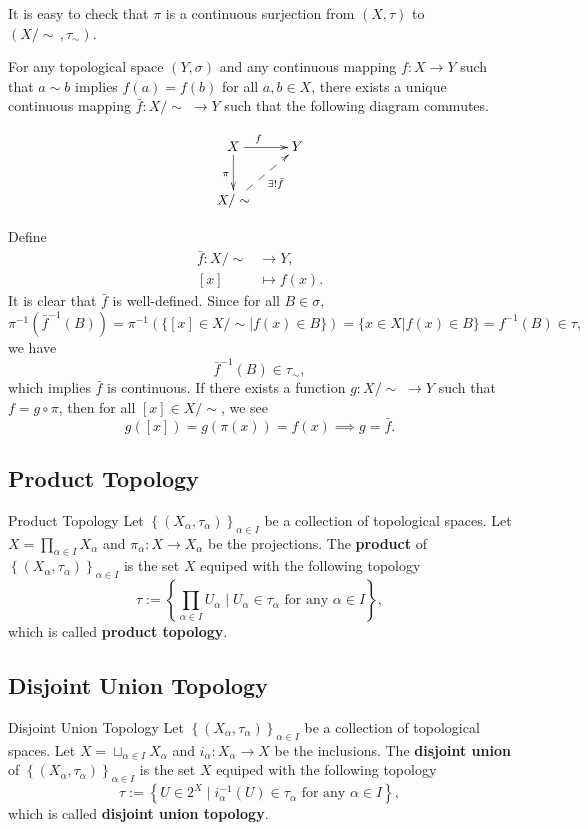 \documentclass{report}
\begin{document}
It is easy to check that $\pi$ is a continuous surjection from $(X,\tau)$ to $(X/\sim\,,\tau_\sim)$.

\begin{proposition}{}{}
	For any topological space $(Y,\sigma)$ and any continuous mapping $f:X\to Y$ such that $a\sim b$ implies $f(a) = f(b)$ for all $a,b \in X$, there exists a unique continuous mapping $\bar{f}:X/\sim\;\to Y$ such that the following diagram commutes.

	\[\xymatrix{
		X\ar[r]^{f\quad}\ar[d]_{\pi}  &Y\\
		X/\sim\ar@{-->}[ru]_{\exists!\bar{f}}&
		}\]
\end{proposition}



\begin{prf}
	Define
	\begin{align*}
		\bar{f}:X/\sim & \longrightarrow Y, \\
		[x]            & \longmapsto f(x).
	\end{align*}
	It is clear that $\bar{f}$ is well-defined. Since for all $B\in \sigma$,
	\[
		\pi^{-1}\left(\bar{f}^{-1}(B)\right)=\pi^{-1}\left(\{[x]\in X/\sim| f(x)\in B\}\right)=\{x\in X| f(x)\in B\}=f^{-1}(B)\in \tau,
	\]
	we have
	\[
		\bar{f}^{-1}(B)\in \tau_\sim,
	\]
	which implies $\bar{f}$ is continuous. If there exists a function $g:X/\sim\;\to Y$ such that $f=g\circ\pi$, then for all $[x]\in X/\sim$, we see
	\[
		g([x])=g(\pi(x))=f(x)\implies g=\bar{f}.
	\]
\end{prf}



\subsection{Product Topology}
\begin{definition}{Product Topology}{}
	Let $\left\{(X_\alpha,\tau_\alpha)\right\}_{\alpha\in I}$ be a collection of topological spaces. Let $X=\prod_{\alpha\in I}X_\alpha$ and $\pi_\alpha:X\to X_\alpha$ be the projections. The \textbf{product} of $\left\{(X_\alpha,\tau_\alpha)\right\}_{\alpha\in I}$ is the set $X$ equiped with the following topology
	\[
		\tau:=\left\{\prod_{\alpha\in I}U_\alpha\mid U_\alpha\in \tau_\alpha\text{ for any }\alpha\in I\right\},
	\]
	which is called \textbf{product topology}.
\end{definition}


\subsection{Disjoint Union Topology}
\begin{definition}{Disjoint Union Topology}{}
	Let $\left\{(X_\alpha,\tau_\alpha)\right\}_{\alpha\in I}$ be a collection of topological spaces. Let $X=\sqcup_{\alpha\in I}X_\alpha$ and $i_\alpha:X_\alpha\to X$ be the inclusions. The \textbf{disjoint union} of $\left\{(X_\alpha,\tau_\alpha)\right\}_{\alpha\in I}$ is the set $X$ equiped with the following topology
	\[
		\tau:=\left\{U\in 2^{X}\mid i_{\alpha}^{-1}(U)\in \tau_\alpha\text{ for any }\alpha\in I\right\},
	\]
	which is called \textbf{disjoint union topology}.
\end{definition}
\end{document}
